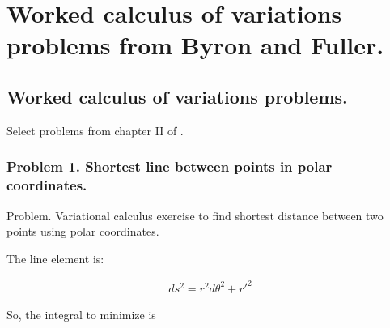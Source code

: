 
%
%





\chapter{Worked calculus of variations problems from Byron and Fuller. }
\label{chap:PJbyronFullerCalcVarProblems}
\date{ March 21, 2009.  byronFullerCalcVar.tex }

%


\section{Worked calculus of variations problems. }

Select problems from chapter II of \citep{byron1992mca}.

\subsection{Problem 1.  Shortest line between points in polar coordinates. }

Problem.  Variational calculus exercise to find shortest distance between two points using polar coordinates.
 
The line element is:
 
\begin{align*}
ds^2 = r^2 d\theta^2 + {r'}^2
\end{align*}
 
So, the integral to minimize is
 
